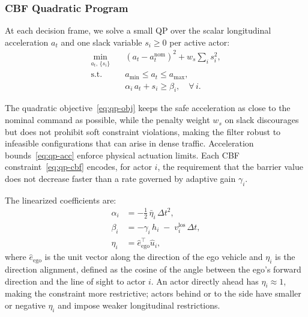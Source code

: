 \subsubsection{CBF Quadratic Program}

At each decision frame, we solve a small QP over the scalar longitudinal acceleration $a_t$ and one slack variable $s_i \ge 0$ per active actor:
\begin{align}
\min_{a_t,\,\{s_i\}} \quad & \left(a_t - a_t^{\text{nom}}\right)^2 + w_s \sum_i s_i^2, \label{eq:qp-obj}\\
\text{s.t.} \quad & a_{\min} \le a_t \le a_{\max}, \label{eq:qp-acc}\\
& \alpha_i\, a_t + s_i \ge \beta_i, \quad \forall\, i. \label{eq:qp-cbf}
\end{align}

The quadratic objective~\eqref{eq:qp-obj} keeps the safe acceleration as close to the nominal command as possible, while the penalty weight $w_s$ on slack discourages but does not prohibit soft constraint violations, making the filter robust to infeasible configurations that can arise in dense traffic. Acceleration bounds~\eqref{eq:qp-acc} enforce physical actuation limits. Each CBF constraint~\eqref{eq:qp-cbf} encodes, for actor $i$, the requirement that the barrier value does not decrease faster than a rate governed by adaptive gain $\gamma_i$.

The linearized coefficients are:
\begin{align}
\alpha_i &= -\tfrac{1}{2}\,\bar\eta_i\,\Delta t^2, \\
\beta_i  &= -\gamma_i\, h_i \;-\; v_i^{\text{los}}\,\Delta t, \\
\eta_i   &= \hat{e}_{\text{ego}}^\top \hat{u}_i,
\end{align}
where $\hat{e}_{\text{ego}}$ is the unit vector along the direction of the ego vehicle and $\eta_i$ is the direction alignment, defined as the cosine of the angle between the ego's forward direction and the line of sight to actor $i$. An actor directly ahead has $\eta_i \approx 1$, making the constraint more restrictive; actors behind or to the side have smaller or negative $\eta_i$ and impose weaker longitudinal restrictions.

